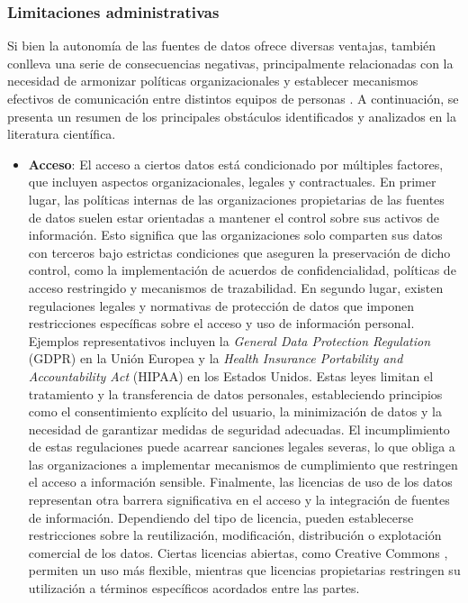     \subsubsection{Limitaciones administrativas}

        Si bien la autonomía de las fuentes de datos ofrece diversas ventajas, también conlleva una serie de consecuencias negativas, principalmente relacionadas con la necesidad de armonizar políticas organizacionales y establecer mecanismos efectivos de comunicación entre distintos equipos de personas \cites*{miller2018open, mcleod1980federated}.
        A continuación, se presenta un resumen de los principales obstáculos identificados y analizados en la literatura científica.

        \begin{itemize}
            \item \textbf{Acceso}: El acceso a ciertos datos está condicionado por múltiples factores, que incluyen aspectos organizacionales, legales y contractuales. 
            En primer lugar, las políticas internas de las organizaciones propietarias de las fuentes de datos suelen estar orientadas a mantener el control sobre sus activos de información. Esto significa que las organizaciones solo comparten sus datos con terceros bajo estrictas condiciones que aseguren la preservación de dicho control, como la implementación de acuerdos de confidencialidad, políticas de acceso restringido y mecanismos de trazabilidad.
            En segundo lugar, existen regulaciones legales y normativas de protección de datos que imponen restricciones específicas sobre el acceso y uso de información personal. 
            Ejemplos representativos incluyen la \textit{General Data Protection Regulation} (GDPR) \cites*{gdpr, voigt2017eu} en la Unión Europea y la \textit{Health Insurance Portability and Accountability Act} (HIPAA) \cites*{hipaa,cohen2018hipaa} en los Estados Unidos. Estas leyes limitan el tratamiento y la transferencia de datos personales, estableciendo principios como el consentimiento explícito del usuario, la minimización de datos y la necesidad de garantizar medidas de seguridad adecuadas. El incumplimiento de estas regulaciones puede acarrear sanciones legales severas, lo que obliga a las organizaciones a implementar mecanismos de cumplimiento que restringen el acceso a información sensible.
            Finalmente, las licencias de uso de los datos representan otra barrera significativa en el acceso y la integración de fuentes de información. 
            Dependiendo del tipo de licencia, pueden establecerse restricciones sobre la reutilización, modificación, distribución o explotación comercial de los datos. Ciertas licencias abiertas, como Creative Commons \cite{creativecommons}, permiten un uso más flexible, mientras que licencias propietarias restringen su utilización a términos específicos acordados entre las partes.

\end{itemize}
